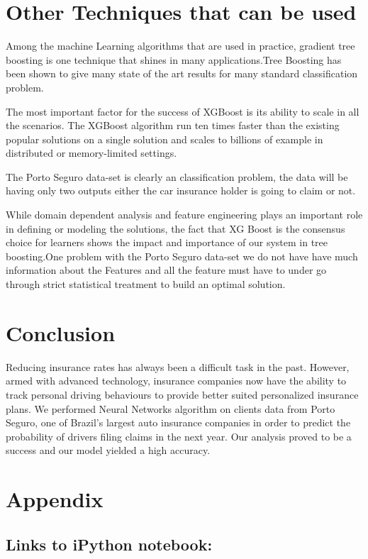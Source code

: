 \section{Other Techniques that can be used}

Among the machine Learning algorithms that are used in practice, gradient tree boosting is one technique that shines in many applications.Tree Boosting has been shown to give many state of the art results for many standard classification problem.

The most important factor for the success of XGBoost is its ability to scale in all the scenarios. The XGBoost algorithm run ten times faster than the existing popular solutions on a single solution and scales to billions of example in distributed or memory-limited settings.

The Porto Seguro data-set is clearly an classification problem, the data will be having only two outputs either the car insurance holder is going to claim or not.

While domain dependent analysis and feature engineering plays an important role in defining or modeling the solutions, the fact that XG Boost is the consensus choice for learners shows the impact and importance  of our system in tree boosting.One problem with the Porto Seguro data-set we do not have have much information about the Features and all the feature must have to under go through strict statistical treatment to build an optimal solution.

\section{Conclusion}

Reducing insurance rates has always been a difficult task in the past. However, armed with advanced technology, insurance companies now have the ability to track personal driving behaviours to provide better suited personalized insurance plans. We performed Neural Networks algorithm on clients data from Porto Seguro, one of Brazil's largest auto insurance companies in order to predict the probability of drivers filing claims in the next year. Our analysis proved to be a success and our model yielded a high accuracy.


\section{Appendix}

\subsection{Links to iPython notebook:}

